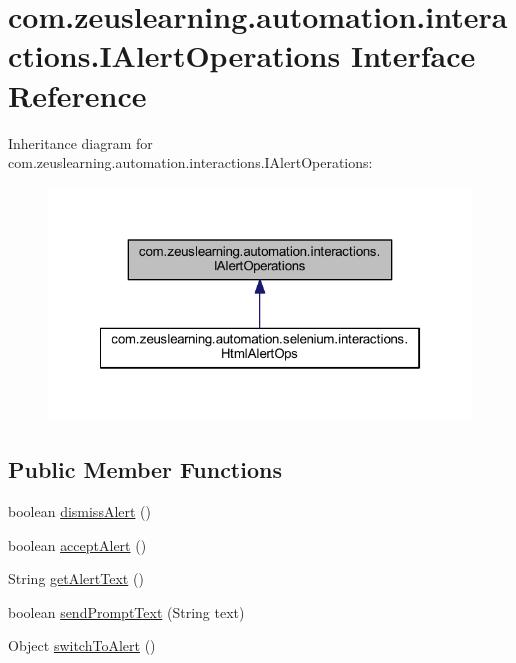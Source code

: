 \hypertarget{interfacecom_1_1zeuslearning_1_1automation_1_1interactions_1_1IAlertOperations}{}\section{com.\+zeuslearning.\+automation.\+interactions.\+I\+Alert\+Operations Interface Reference}
\label{interfacecom_1_1zeuslearning_1_1automation_1_1interactions_1_1IAlertOperations}


Inheritance diagram for com.\+zeuslearning.\+automation.\+interactions.\+I\+Alert\+Operations\+:\nopagebreak
\begin{figure}[H]
\begin{center}
\leavevmode
\includegraphics[width=322pt]{d8/d54/interfacecom_1_1zeuslearning_1_1automation_1_1interactions_1_1IAlertOperations__inherit__graph}
\end{center}
\end{figure}
\subsection*{Public Member Functions}
\begin{DoxyCompactItemize}
\item 
boolean \hyperlink{interfacecom_1_1zeuslearning_1_1automation_1_1interactions_1_1IAlertOperations_a0c8a54b5a80611b77880dd4cc999e88d}{dismiss\+Alert} ()
\item 
boolean \hyperlink{interfacecom_1_1zeuslearning_1_1automation_1_1interactions_1_1IAlertOperations_a8be09398358c0a51e5ff2058969853fd}{accept\+Alert} ()
\item 
String \hyperlink{interfacecom_1_1zeuslearning_1_1automation_1_1interactions_1_1IAlertOperations_a25201bfa012a2411b487821f1837476a}{get\+Alert\+Text} ()
\item 
boolean \hyperlink{interfacecom_1_1zeuslearning_1_1automation_1_1interactions_1_1IAlertOperations_a1a33aeab4f1ae33df2a7abb46fd0edd3}{send\+Prompt\+Text} (String text)
\item 
Object \hyperlink{interfacecom_1_1zeuslearning_1_1automation_1_1interactions_1_1IAlertOperations_a8f0851a83f41aef25635fb1b32f15c08}{switch\+To\+Alert} ()
\end{DoxyCompactItemize}


